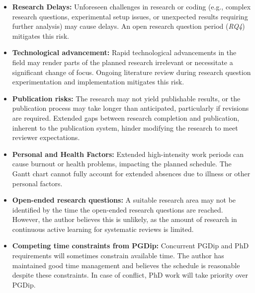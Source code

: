 \documentclass[10pt,oneside]{book}
\begin{document}
\begin{itemize}
    \item \textbf{Research Delays:} Unforeseen challenges in research or coding (e.g., complex research questions, experimental setup issues, or unexpected results requiring further analysis) may cause delays.  An open research question period (\emph{RQ4}) mitigates this risk.
    \item \textbf{Technological advancement:} Rapid technological advancements in the field may render parts of the planned research irrelevant or necessitate a significant change of focus. Ongoing literature review during research question experimentation and implementation mitigates this risk.
    \item \textbf{Publication risks:} 
    The research may not yield publishable results, or the publication process may take longer than anticipated, particularly if revisions are required. Extended gaps between research completion and publication, inherent to the publication system, hinder modifying the research to meet reviewer expectations.
    \item \textbf{Personal and Health Factors:} Extended high-intensity work periods can cause burnout or health problems, impacting the planned schedule. The Gantt chart cannot fully account for extended absences due to illness or other personal factors.
    \item \textbf{Open-ended research questions:} A suitable research area may not be identified by the time the open-ended research questions are reached. However, the author believes this is unlikely, as the amount of research in continuous active learning for systematic reviews is limited.
    \item \textbf{Competing time constraints from PGDip:} Concurrent PGDip and PhD requirements will sometimes constrain available time. The author has maintained good time management and believes the schedule is reasonable despite these constraints. In case of conflict, PhD work will take priority over PGDip.
\end{itemize}
\end{document}

